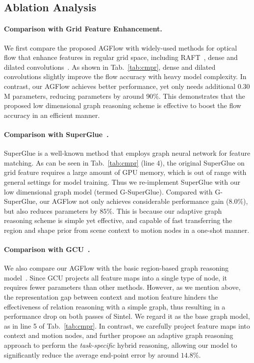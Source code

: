 \documentclass[letterpaper]{article} %
\begin{document}
\subsection{Ablation Analysis} \label{sec:4}

\paragraph{Comparison with Grid Feature Enhancement.}
We first compare the proposed AGFlow with widely-used methods for optical flow that enhance features in regular grid space, including RAFT~\cite{Teed2020RAFTRA}, dense and dilated convolutions~\cite{Sun2018PWCNetCF, Hur2019IterativeRR}. As shown in Tab.~\ref{tab:cmpr}, dense and dilated convolutions slightly improve the flow accuracy with heavy model complexity. In contrast, our AGFlow achieves better performance, yet only needs additional $0.30$ M parameters, reducing parameters by around $90\%$. This demonstrates that the proposed low dimensional graph reasoning scheme is effective to boost the flow accuracy in an efficient manner.

\paragraph{Comparison with SuperGlue~\cite{Sarlin2020SuperGlueLF}.} SuperGlue is a well-known method that employs graph neural network for feature matching. As can be seen in Tab.~\ref{tab:cmpr} (line 4), the original SuperGlue on grid feature requires a large amount of GPU memory, which is out of range with general settings for model training. Thus we re-implement SuperGlue with our low dimensional graph model (termed G-SuperGlue). Compared with G-SuperGlue, our AGFlow not only achieves considerable performance gain ($8.0\%$), but also reduces parameters by $85\%$. This is because our adaptive graph reasoning scheme is simple yet effective, and capable of fast transferring the region and shape prior from scene context to motion nodes in a one-shot manner.

\paragraph{Comparison with GCU~\cite{Li2018BeyondGL}.}
We also compare our AGFlow with the basic region-based graph reasoning model~\cite{Li2018BeyondGL}. Since GCU projects all feature maps into a single type of node, it requires fewer parameters than other methods. However, as we mention above, the representation gap between context and motion feature hinders the effectiveness of relation reasoning with a simple graph, thus resulting in a performance drop on both passes of Sintel. We regard it as the base graph model, as in line 5 of Tab.~\ref{tab:cmpr}. In contrast, we carefully project feature maps into context and motion nodes, and further propose an adaptive graph reasoning approach to perform the {\em task-specific} hybrid reasoning, allowing our model to significantly reduce the average end-point error by around $14.8\%$.
\end{document}
